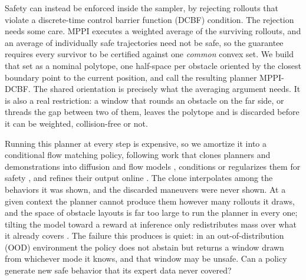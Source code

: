 \documentclass[letterpaper, 10 pt, conference]{ieeeconf}
\begin{document}
{\color{blue}
Safety can instead be enforced inside the sampler, by rejecting rollouts that violate a discrete-time control barrier function (DCBF) condition. The rejection needs some care. MPPI executes a weighted average of the surviving rollouts, and an average of individually safe trajectories need not be safe, so the guarantee requires every survivor to be certified against one \emph{common} convex set. We build that set as a nominal polytope, one half-space per obstacle oriented by the closest boundary point to the current position, and call the resulting planner MPPI-DCBF. The shared orientation is precisely what the averaging argument needs. It is also a real restriction: a window that rounds an obstacle on the far side, or threads the gap between two of them, leaves the polytope and is discarded before it can be weighted, collision-free or not.
}

{\color{blue}
Running this planner at every step is expensive, so we amortize it into a conditional flow matching policy, following work that clones planners and demonstrations into diffusion and flow models \cite{kurtz2025generative, chi2023diffusion}, conditions or regularizes them for safety \cite{dai2025safefm, carvalho2023mpdiffusion}, and refines their output online \cite{mizuta2025unified}. The clone interpolates among the behaviors it was shown, and the discarded maneuvers were never shown. At a given context the planner cannot produce them however many rollouts it draws, and the space of obstacle layouts is far too large to run the planner in every one; tilting the model toward a reward at inference only redistributes mass over what it already covers \cite{dandapanthula2026we}. The failure this produces is quiet: in an out-of-distribution (OOD) environment the policy does not abstain but returns a window drawn from whichever mode it knows, and that window may be unsafe. Can a policy generate new safe behavior that its expert data never covered?
}
\end{document}
